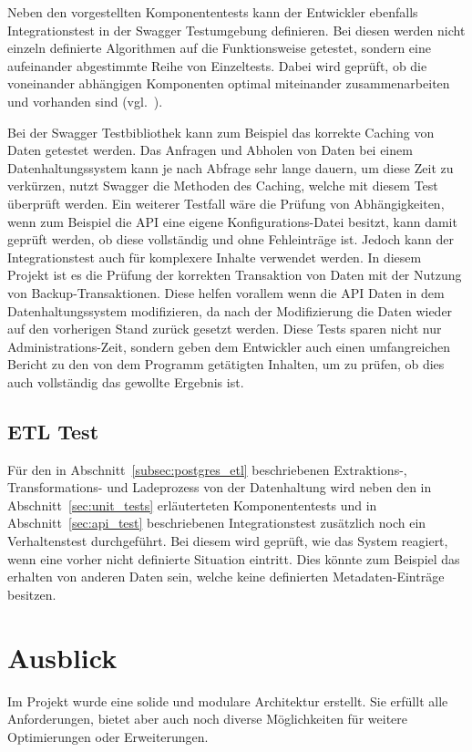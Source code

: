 {Neben den vorgestellten Komponententests kann der Entwickler ebenfalls
Integrationstest in der Swagger Testumgebung definieren. Bei diesen werden
nicht einzeln definierte Algorithmen auf die Funktionsweise getestet, sondern
eine aufeinander abgestimmte Reihe von Einzeltests. Dabei wird geprüft, ob die
voneinander abhängigen Komponenten optimal miteinander zusammenarbeiten und
vorhanden sind (vgl.~\cite{Spring_Testing}).

Bei der Swagger Testbibliothek kann zum Beispiel das korrekte Caching von Daten
getestet werden. Das Anfragen und Abholen von Daten bei einem
Datenhaltungssystem kann je nach Abfrage sehr lange dauern, um diese Zeit zu
verkürzen, nutzt Swagger die Methoden des Caching, welche mit diesem Test
überprüft werden. Ein weiterer Testfall wäre die Prüfung von Abhängigkeiten,
wenn zum Beispiel die API eine eigene Konfigurations\hyp{}Datei besitzt, kann
damit geprüft werden, ob diese vollständig und ohne Fehleinträge ist. Jedoch
kann der Integrationstest auch für komplexere Inhalte verwendet werden. In
diesem Projekt ist es die Prüfung der korrekten Transaktion von Daten mit der
Nutzung von Backup\hyp{}Transaktionen. Diese helfen vorallem wenn die API Daten
in dem Datenhaltungssystem modifizieren, da nach der Modifizierung die Daten
wieder auf den vorherigen Stand zurück gesetzt werden. Diese Tests sparen nicht
nur Administrations\hyp{}Zeit, sondern geben dem Entwickler auch einen
umfangreichen Bericht zu den von dem Programm getätigten Inhalten, um zu
prüfen, ob dies auch vollständig das gewollte Ergebnis ist.
\nl%

\section{ETL Test}
\label{sec:etl_test}
Für den in Abschnitt~\ref{subsec:postgres_etl} beschriebenen Extraktions-,
Transformations- und Ladeprozess von der Datenhaltung wird neben den
in Abschnitt~\ref{sec:unit_tests} erläuterteten Komponententests und
in Abschnitt~\ref{sec:api_test} beschriebenen Integrationstest zusätzlich
noch ein Verhaltenstest durchgeführt. Bei diesem wird geprüft, wie das
System reagiert, wenn eine vorher nicht definierte Situation eintritt.
Dies könnte zum Beispiel das erhalten von anderen Daten sein, welche keine
definierten Metadaten\hyp{}Einträge besitzen.
\nl%

\chapter{Ausblick}
\label{chapter:ausblick}
Im Projekt wurde eine solide und modulare Architektur erstellt. Sie erfüllt
alle Anforderungen, bietet aber auch noch diverse Möglichkeiten für
weitere Optimierungen oder Erweiterungen.
\tm%

}
